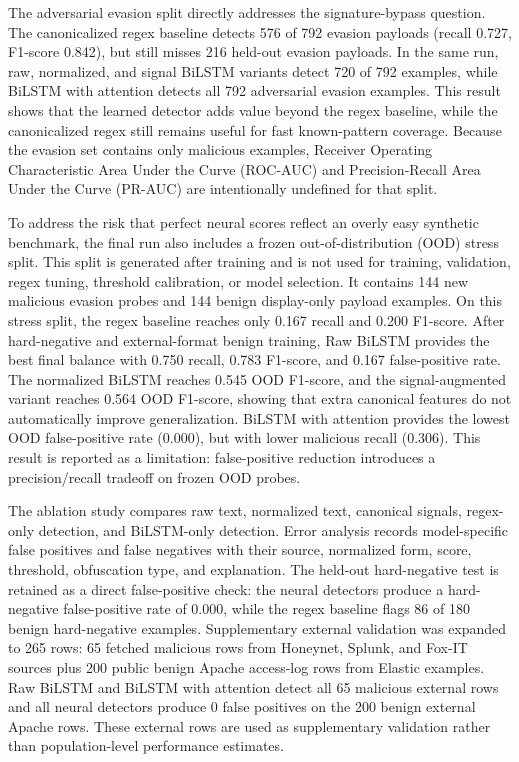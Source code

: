 \documentclass[conference]{IEEEtran}
\begin{document}
The adversarial evasion split directly addresses the signature-bypass question.
The canonicalized regex baseline detects 576 of 792 evasion payloads (recall
0.727, F1-score 0.842), but still misses 216 held-out evasion payloads. In the
same run, raw, normalized, and signal BiLSTM variants detect 720 of 792
examples, while BiLSTM with attention detects all 792 adversarial evasion
examples. This result shows that the learned detector adds value beyond the
regex baseline, while the canonicalized regex still remains useful for fast
known-pattern coverage.
Because the evasion set contains only malicious examples, Receiver Operating
Characteristic Area Under the Curve (ROC-AUC) and Precision-Recall Area Under
the Curve (PR-AUC) are intentionally undefined for that split.

To address the risk that perfect neural scores reflect an overly easy
synthetic benchmark, the final run also includes a frozen out-of-distribution
(OOD) stress split. This split is generated after training and is not used for
training, validation, regex tuning, threshold calibration, or model selection.
It contains 144 new malicious evasion probes and 144 benign display-only
payload examples. On this stress split, the regex baseline reaches only
0.167 recall and 0.200 F1-score. After hard-negative and external-format
benign training, Raw BiLSTM provides the best final balance with 0.750 recall,
0.783 F1-score, and 0.167 false-positive rate. The normalized BiLSTM reaches
0.545 OOD F1-score, and the signal-augmented variant reaches 0.564 OOD
F1-score, showing that extra canonical features do not automatically improve
generalization. BiLSTM with attention provides the lowest OOD false-positive
rate (0.000), but with lower malicious recall (0.306). This result is reported
as a limitation: false-positive reduction introduces a precision/recall
tradeoff on frozen OOD probes.

The ablation study compares raw text, normalized text, canonical signals,
regex-only detection, and BiLSTM-only detection. Error
analysis records model-specific false positives and false negatives with their
source, normalized form, score, threshold, obfuscation type, and explanation.
The held-out hard-negative test is retained as a direct false-positive check:
the neural detectors produce a hard-negative false-positive rate of 0.000,
while the regex baseline flags 86 of 180 benign hard-negative examples.
Supplementary external validation was expanded to 265 rows: 65 fetched
malicious rows from Honeynet, Splunk, and Fox-IT sources plus 200 public benign
Apache access-log rows from Elastic examples. Raw BiLSTM and BiLSTM with
attention detect all 65 malicious external rows and all neural detectors
produce 0 false positives on the 200 benign external Apache rows. These
external rows are used as supplementary validation rather than population-level
performance estimates.
\end{document}
